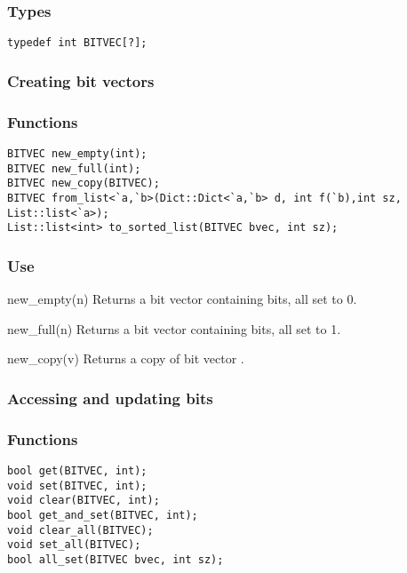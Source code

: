 \subsubsection*{Types}
\begin{verbatim}
typedef int BITVEC[?];
\end{verbatim}

\subsubsection*{Creating bit vectors}

\subsubsection*{Functions}
\begin{verbatim}
BITVEC new_empty(int);
BITVEC new_full(int);
BITVEC new_copy(BITVEC);
BITVEC from_list<`a,`b>(Dict::Dict<`a,`b> d, int f(`b),int sz, List::list<`a>);
List::list<int> to_sorted_list(BITVEC bvec, int sz);
\end{verbatim}

\subsubsection*{Use}

\begin{defun}{new_empty}{(n)}
Returns a bit vector containing  bits, all set to 0.
\end{defun}

\begin{defun}{new_full}{(n)}
Returns a bit vector containing  bits, all set to 1.
\end{defun}

\begin{defun}{new_copy}{(v)}
Returns a copy of bit vector .
\end{defun}

\subsubsection*{Accessing and updating bits}

\subsubsection*{Functions}
\begin{verbatim}
bool get(BITVEC, int);
void set(BITVEC, int);
void clear(BITVEC, int);
bool get_and_set(BITVEC, int);
void clear_all(BITVEC);
void set_all(BITVEC);
bool all_set(BITVEC bvec, int sz);
\end{verbatim}

